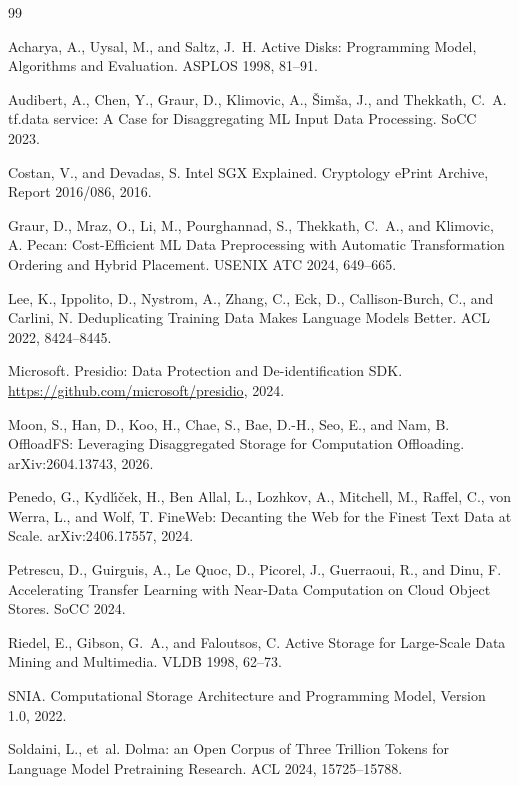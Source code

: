 \documentclass[11pt]{article}
\begin{document}
\begin{thebibliography}{99}

 Acharya, A., Uysal, M., and Saltz, J.~H. Active Disks: Programming Model, Algorithms and Evaluation. ASPLOS 1998, 81--91.

 Audibert, A., Chen, Y., Graur, D., Klimovic, A., \v{S}im\v{s}a, J., and Thekkath, C.~A. tf.data service: A Case for Disaggregating ML Input Data Processing. SoCC 2023.

 Costan, V., and Devadas, S. Intel SGX Explained. Cryptology ePrint Archive, Report 2016/086, 2016.

 Graur, D., Mraz, O., Li, M., Pourghannad, S., Thekkath, C.~A., and Klimovic, A. Pecan: Cost-Efficient ML Data Preprocessing with Automatic Transformation Ordering and Hybrid Placement. USENIX ATC 2024, 649--665.

 Lee, K., Ippolito, D., Nystrom, A., Zhang, C., Eck, D., Callison-Burch, C., and Carlini, N. Deduplicating Training Data Makes Language Models Better. ACL 2022, 8424--8445.

 Microsoft. Presidio: Data Protection and De-identification SDK. \url{https://github.com/microsoft/presidio}, 2024.

 Moon, S., Han, D., Koo, H., Chae, S., Bae, D.-H., Seo, E., and Nam, B. OffloadFS: Leveraging Disaggregated Storage for Computation Offloading. arXiv:2604.13743, 2026.

 Penedo, G., Kydl\'{\i}\v{c}ek, H., Ben Allal, L., Lozhkov, A., Mitchell, M., Raffel, C., von Werra, L., and Wolf, T. FineWeb: Decanting the Web for the Finest Text Data at Scale. arXiv:2406.17557, 2024.

 Petrescu, D., Guirguis, A., Le Quoc, D., Picorel, J., Guerraoui, R., and Dinu, F. Accelerating Transfer Learning with Near-Data Computation on Cloud Object Stores. SoCC 2024.

 Riedel, E., Gibson, G.~A., and Faloutsos, C. Active Storage for Large-Scale Data Mining and Multimedia. VLDB 1998, 62--73.

 SNIA. Computational Storage Architecture and Programming Model, Version 1.0, 2022.

 Soldaini, L., et~al. Dolma: an Open Corpus of Three Trillion Tokens for Language Model Pretraining Research. ACL 2024, 15725--15788.


\end{thebibliography}
\end{document}
